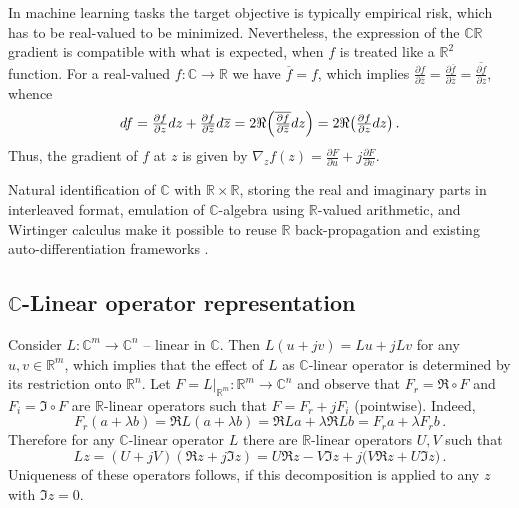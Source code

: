 \documentclass[a4paper,10pt]{article}
\newcommand{\real}{\mathbb{R}}
\newcommand{\cplx}{\mathbb{C}}
\newcommand{\conj}[1]{\overline{#1}}
\begin{document}
In machine learning tasks the target objective is typically empirical risk, which has to
be real-valued to be minimized. Nevertheless, the expression of the $\cplx\real$ gradient
is compatible with what is expected, when $f$ is treated like a $\real^2$ function. For a
real-valued $f\colon \cplx \to \real$ we have $\conj{f} = f$, which implies $
  \tfrac{\partial f}{\partial \conj{z}}
    = \tfrac{\partial \conj{f}}{\partial \conj{z}}
    = \conj{\tfrac{\partial f}{\partial z}}
$, whence
$$
df
  = \tfrac{\partial f}{\partial z} dz
    + \tfrac{\partial f}{\partial \conj{z}} d\conj{z}
  = 2 \Re \Bigl(
    \conj{\tfrac{\partial f}{\partial \conj{z}}} dz
  \Bigr)
  = 2 \Re \bigl(
    \tfrac{\partial f}{\partial z} dz
  \bigr)
  \,. $$
Thus, the gradient of $f$ at $z$ is given by $
  \nabla_z f(z)
    = \tfrac{\partial F}{\partial u}
      + j \tfrac{\partial F}{\partial v}
$.

Natural identification of $\cplx$ with $\real\times \real$, storing the real and imaginary
parts in interleaved format, emulation of $\cplx$-algebra using $\real$-valued arithmetic,
and Wirtinger calculus make it possible to reuse $\real$ back-propagation and existing
auto-differentiation frameworks \citep{trabelsi_deep_2017}.


\subsection{$\cplx$-Linear operator representation} %
\label{sub:c-linear_operator_representation}

Consider $L \colon \cplx^m \to \cplx^n$ -- linear in $\cplx$. Then $
  L(u + jv) = L u + j L v
$ for any $u, v \in \real^m$, which implies that the effect of $L$ as $\cplx$-linear
operator is determined by its restriction onto $\real^n$. Let $
  F = L\vert_{\real^m}
  \colon \real^m \to \cplx^n
$ and observe that $F_r = \Re \circ F$ and $F_i = \Im \circ F$ are $\real$-linear operators
such that $F = F_r + j F_i$ (pointwise). Indeed,
$$
  F_r(a + \lambda b)
  = \Re L(a + \lambda b)
  = \Re L a + \lambda \Re L b
  = F_r a + \lambda F_r b
  \,. $$
Therefore for any $\cplx$-linear operator $L$ there are $\real$-linear operators $U, V$
such that
$$
L z 
  = (U + j V) (\Re z + j \Im z)
  = U \Re z - V \Im z + j \bigl( V \Re z + U \Im z \bigr)
  \,. $$
Uniqueness of these operators follows, if this decomposition is applied to any $z$ with
$\Im z = 0$.


\end{document}
